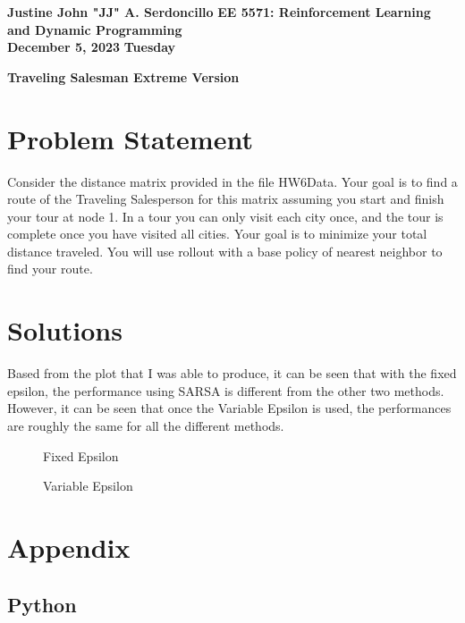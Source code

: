 \documentclass{article}
\begin{document}
	
	\noindent\textbf{Justine John "JJ" A. Serdoncillo}
	\hfill \textbf{EE 5571: Reinforcement Learning and Dynamic Programming} \\ \hfill \textbf{December 5, 2023}
    \hfill \textbf{Tuesday}
	
	\begin{center}
		\Large{\textbf{Traveling Salesman Extreme Version}} 
	\end{center}
	
	\section*{Problem Statement}
    Consider the distance matrix provided in the file HW6Data. Your goal is to find a route of the Traveling Salesperson for this matrix assuming you start and finish your tour at node 1. In a tour you can only visit each city once, and the tour is complete once you have visited all cities. Your goal is to minimize your total distance traveled. You will use rollout with a base policy of nearest neighbor to find your route.

    \section*{Solutions}
        Based from the plot that I was able to produce, it can be seen that with the fixed epsilon, the performance using SARSA is different from the other two methods. 
        However, it can be seen that once the Variable Epsilon is used, the performances are roughly the same for all the different methods.
            \begin{figure}[H]
				\centering
				\caption{ Fixed Epsilon }
			\end{figure}
            \begin{figure}[H]
				\centering
				\caption{ Variable Epsilon }
			\end{figure}
   
                    
		\newpage
		\section*{Appendix}
			\subsection*{ Python }
			
\end{document}
